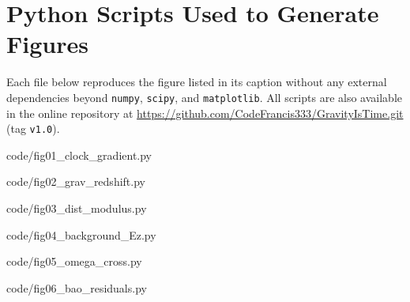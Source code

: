 \chapter{Python Scripts Used to Generate Figures}

Each file below reproduces the figure listed in its caption without any
external dependencies beyond \texttt{numpy}, \texttt{scipy}, and
\texttt{matplotlib}.  All scripts are also available in the online
repository at \url{https://github.com/CodeFrancis333/GravityIsTime.git} (tag
\texttt{v1.0}).

\bigskip
\noindent

{code/fig01_clock_gradient.py}


{code/fig02_grav_redshift.py}


{code/fig03_dist_modulus.py}


{code/fig04_background_Ez.py}


{code/fig05_omega_cross.py}


{code/fig06_bao_residuals.py}

